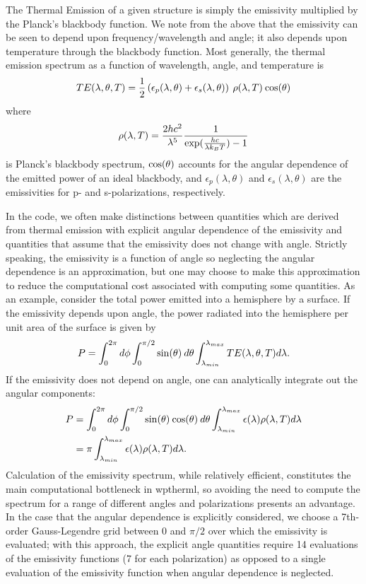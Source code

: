 \documentclass[journal=jpclcd,manuscript=suppinfo]{achemso}
\begin{document}
The Thermal Emission of a given structure is simply the emissivity multiplied
by the Planck's blackbody function.  We note from the above that the emissivity
can be seen to depend upon frequency/wavelength and angle; it also depends
upon temperature through the blackbody function.  Most generally, the thermal emission
spectrum as a function of wavelength, angle, and temperature is
\begin{equation}
TE(\lambda, \theta, T) = 
\frac{1}{2}\left( \epsilon_p(\lambda, \theta) + \epsilon_s(\lambda, \theta) \right) \:
\rho(\lambda, T) \: {\rm cos}(\theta)
\end{equation} 
where 
\begin{equation}
\rho(\lambda, T) = \frac{2hc^2}{\lambda^5} 
\frac{1}{{\rm exp}(\frac{hc}{\lambda k_B T})-1}
\end{equation}
is Planck's blackbody spectrum, ${\rm cos}(\theta)$ accounts
for the angular dependence of the emitted power of an ideal blackbody, and $\epsilon_p(\lambda, \theta)$ and $\epsilon_s(\lambda, \theta)$ are the emissivities for p- and s-polarizations, respectively.

In the code, we often make distinctions between quantities which are derived
from thermal emission with explicit angular dependence of the emissivity and quantities
that assume that the emissivity does not change with angle.  Strictly speaking, 
the emissivity is a function of angle so neglecting the angular dependence is an 
approximation, but one may choose to make this approximation to reduce the computational
cost associated with computing some quantities.  As an example, consider the total 
power emitted into a hemisphere by a surface.  If the emissivity depends upon angle, the
power radiated into the hemisphere per unit area of the surface is given by
\begin{equation}
P = \int_0^{2\pi} d\phi \int_0^{\pi/2} {\rm sin}(\theta) \: d\theta 
\int_{\lambda_{min}}^{\lambda_{max}} TE(\lambda, \theta, T) d\lambda.
\end{equation}   
If the emissivity does not depend on angle, one can analytically integrate out the 
angular components:
\begin{align}
P &= \int_0^{2\pi} d\phi \int_0^{\pi/2} {\rm sin}(\theta) \: {\rm cos}(\theta) \: d\theta  
\int_{\lambda_{min}}^{\lambda_{max}} \epsilon(\lambda) \rho(\lambda, T) d\lambda \\
 &= \pi \int_{\lambda_{min}}^{\lambda_{max}} \epsilon(\lambda) \rho(\lambda, T) d\lambda.
\end{align}
Calculation of the emissivity spectrum, while relatively efficient,  
constitutes the main computational bottleneck in wptherml, so avoiding
the need to compute the spectrum for a range of different angles and polarizations
presents an advantage.  In the case that the angular dependence is explicitly considered,
we choose a 7th-order Gauss-Legendre grid between 0 and $\pi/2$ over which the emissivity
is evaluated; with this approach, the explicit angle quantities require 14 evaluations
of the emissivity functions (7 for each polarization) as opposed to a single
evaluation of the emissivity function when angular dependence is neglected.
\end{document}
